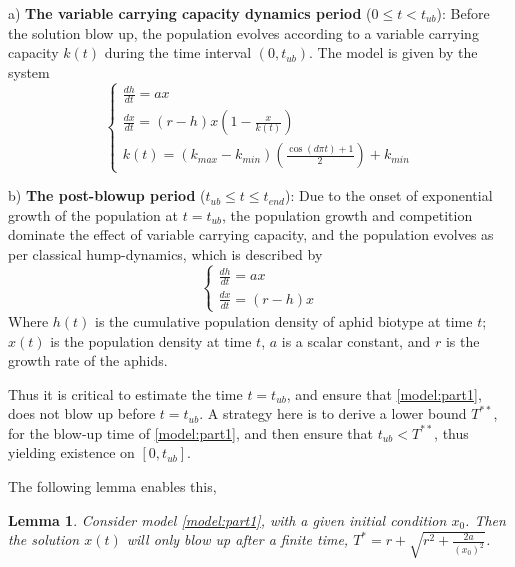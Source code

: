 \documentclass[sn-mathphys-num]{sn-jnl}
\newtheorem{lemma}[theorem]{Lemma}
\numberwithin{equation}{section}
\numberwithin{equation}{section}
\begin{document}
a) \textbf{The variable carrying capacity dynamics period} ($0 \leq t < t_{ub}$): Before the solution blow up, the population evolves according to a variable carrying capacity $k(t)$ during the time interval $(0,t_{ub})$. The model is given by the system
\begin{equation}\label{model:part1}
    \begin{cases}
        \frac{dh}{dt} = a x \\
        \frac{dx}{dt} = (r - h) x \left(1 - \frac{x}{k(t)}\right)\\
        k(t)=(k_{max}-k_{min})\left ( \frac{\cos(d\pi t) +1}{2}\right)+k_{min}
    \end{cases}
\end{equation}

b) \textbf{The post-blowup period} ($t_{ub}\leq t\leq t_{end}$): Due to the onset of exponential growth of the population at $t=t_{ub}$, the population growth and competition dominate the effect of variable carrying capacity, and the population evolves as per classical hump-dynamics, which is described by 
\begin{equation}\label{model:part2}
    \begin{cases}
        \frac{dh}{dt} = a x \\
        \frac{dx}{dt} = (r - h) x 
    \end{cases}
\end{equation}
Where $h(t)$ is the cumulative population density of aphid biotype at time $t$; $x(t)$  is the population density at time $t$, $a$ is a scalar constant, and $r$ is the growth rate of the aphids. 

Thus it is critical to estimate the time $t=t_{ub}$, and ensure that \ref{model:part1}, does not blow up before $t=t_{ub}$. A strategy here is to derive a lower bound $T^{**}$, for the blow-up time of \ref{model:part1}, and then ensure that $t_{ub} < T^{**}$, thus yielding existence on $[0,t_{ub}]$.

The following lemma enables this,

\begin{lemma}
Consider model \ref{model:part1}, with a given initial condition $x_{0}$. Then the solution $x(t)$ will only blow up after a finite time, $T^{*} = r + \sqrt{r^{2}+\frac{2a}{(x_{0})^{2}}}$.
\end{lemma}
\end{document}
